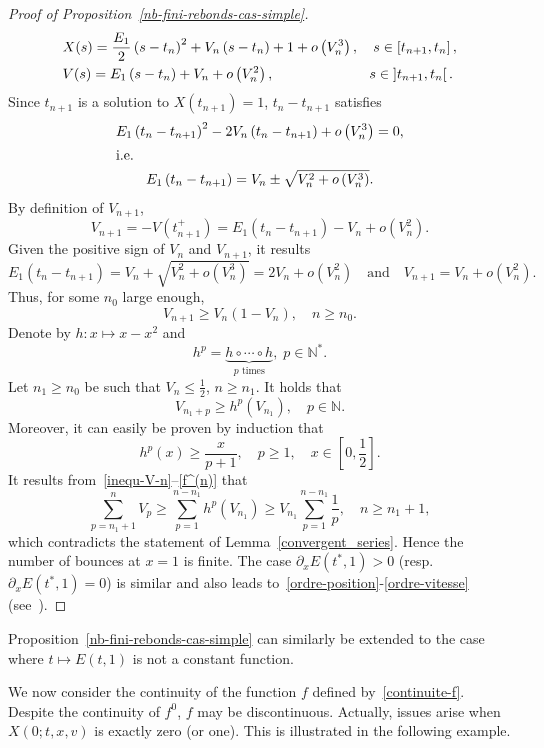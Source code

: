 \documentclass[AHL,Unicode,longabstracts,published]{cedram}
\newcommand{\N}{\mathbb{N}}
\begin{document}
\begin{proof}[{Proof of Proposition~\ref{nb-fini-rebonds-cas-simple}}]
\begin{align}
&X(s)= \frac{E_1}{2}\left(s-t_n\right)^2+V_n\left(s-t_n\right)+1+o\left(V_n^3\right), \quad s\in \left[t_{n+1},t_n\right],\label{ordre-position}
\\
&V(s)= E_1\left(s-t_n\right)+V_n+o\left(V_n^2\right),\mkern122mu s\in\left]t_{n+1},t_n\right[.\label{ordre-vitesse}
\end{align}
Since $t_{n+1}$ is a solution to $X(t_{n+1}) = 1$, $t_n-t_{n+1}$ satisfies
\begin{gather*}
E_1\left(t_n-t_{n+1}\right)^2-2V_n\left(t_n-t_{n+1}\right)+o\left(V_n^3\right)= 0,
\\
\intertext{i.e.}
E_1\left(t_n-t_{n+1}\right) = V_n \pm \sqrt{V_n^2 +o\left(V_n^3\right)}.
\end{gather*}
By definition of $V_{n+1}$,
\[
V_{n+1} = - V\left(t_{n+1}^+\right) = E_1\left(t_n-t_{n+1}\right)-V_n+o\left(V_n^2\right).
\]
Given the positive sign of $V_n$ and $V_{n+1}$, it results
\[
E_1\left(t_n-t_{n+1}\right) = V_n +\sqrt{V_n^2 +o\left(V_n^3\right)}= 2V_n+o\left(V_n^2\right)\quad \text{and}\quad V_{n+1} = V_n+o\left(V_n^2\right).
\]
Thus, for some $n_0$ large enough,
\[
V_{n+1} \geq V_n \left(1 - V_n\right), \quad n \geq n_0.
\]
Denote by $h : x \mapsto x - x^2$ and
\[
h^p = \underbrace{h \circ \cdots \circ h}_{p \text{ times}},\;p \in \N^*.
\]
Let $n_1\geq n_0$ be such that $V_n\leq
\tfrac{1}{2}$, $n\geq n_1$. It holds that
\begin{equation}\label{inequ-V-n}
V_{n_1+p} \geq h^{p}\left(V_{n_1}\right), \quad p \in \N.
\end{equation}
Moreover, it can easily be proven by induction that
\begin{equation}\label{f^(n)}
h^p(x) \geq \frac{x}{p+1},\quad p \geq 1,\quad x \in \left[0, \frac{1}{2} \right].
\end{equation}
It results from~\eqref{inequ-V-n}--\eqref{f^(n)} that
\[
\sum_{p= n_1+1}^n V_p \geq \sum_{p= 1}^{n-n_1} h^p \left(V_{n_1}\right) \geq V_{n_1} \sum_{p= 1}^{n-n_1} \frac{1}{p},\quad n \geq n_1+1,
\]
which contradicts the statement of Lemma~\ref{convergent_series}. Hence the number of bounces at $x=1$ is finite. The case $\partial_x E(t^*,1)>0$ (resp. $\partial_x E(t^*,1)=0$) is similar and also leads to~\eqref{ordre-position}-\eqref{ordre-vitesse} (see~\cite{Gio19}).
\end{proof}

Proposition~\ref{nb-fini-rebonds-cas-simple} can similarly be extended to the case where $t \mapsto E(t,1)$ is not a constant function.

We now consider the continuity of the function $f$ defined by~\eqref{continuite-f}. Despite the continuity of $f^0$, $f$ may be discontinuous. Actually, issues arise when $X(0;t,x,v)$ is exactly zero (or one). This is illustrated in the following example.
\end{document}
